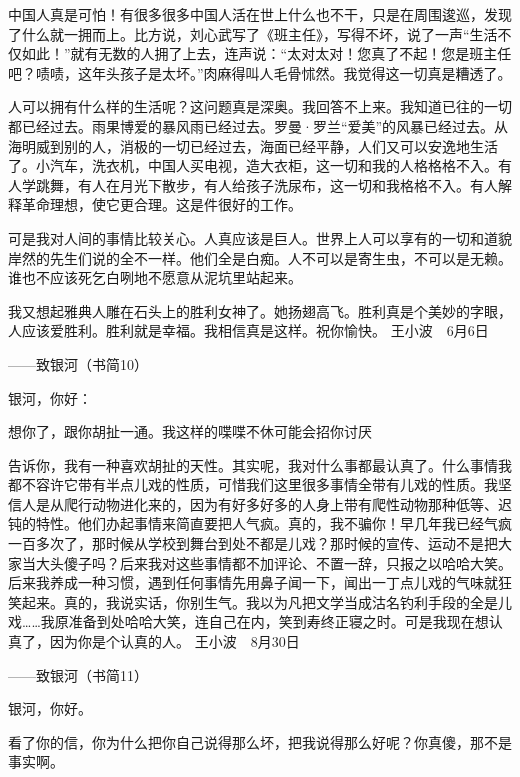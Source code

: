 中国人真是可怕！有很多很多中国人活在世上什么也不干，只是在周围逡巡，发现了什么就一拥而上。比方说，刘心武写了《班主任》，写得不坏，说了一声“生活不仅如此！”就有无数的人拥了上去，连声说：“太对太对！您真了不起！您是班主任吧？啧啧，这年头孩子是太坏。”肉麻得叫人毛骨怵然。我觉得这一切真是糟透了。 

人可以拥有什么样的生活呢？这问题真是深奥。我回答不上来。我知道已往的一切都已经过去。雨果博爱的暴风雨已经过去。罗曼·罗兰“爱美”的风暴已经过去。从海明威到别的人，消极的一切已经过去，海面已经平静，人们又可以安逸地生活了。小汽车，洗衣机，中国人买电视，造大衣柜，这一切和我的人格格格不入。有人学跳舞，有人在月光下散步，有人给孩子洗尿布，这一切和我格格不入。有人解释革命理想，使它更合理。这是件很好的工作。 

可是我对人间的事情比较关心。人真应该是巨人。世界上人可以享有的一切和道貌岸然的先生们说的全不一样。他们全是白痴。人不可以是寄生虫，不可以是无赖。谁也不应该死乞白咧地不愿意从泥坑里站起来。 

我又想起雅典人雕在石头上的胜利女神了。她扬翅高飞。胜利真是个美妙的字眼，人应该爱胜利。胜利就是幸福。我相信真是这样。祝你愉快。 王小波　6月6日 







——致银河（书简10） 

银河，你好：　 

想你了，跟你胡扯一通。我这样的喋喋不休可能会招你讨厌 

告诉你，我有一种喜欢胡扯的天性。其实呢，我对什么事都最认真了。什么事情我都不容许它带有半点儿戏的性质，可惜我们这里很多事情全带有儿戏的性质。我坚信人是从爬行动物进化来的，因为有好多好多的人身上带有爬性动物那种低等、迟钝的特性。他们办起事情来简直要把人气疯。真的，我不骗你！早几年我已经气疯一百多次了，那时候从学校到舞台到处不都是儿戏？那时候的宣传、运动不是把大家当大头傻子吗？后来我对这些事情都不加评论、不置一辞，只报之以哈哈大笑。后来我养成一种习惯，遇到任何事情先用鼻子闻一下，闻出一丁点儿戏的气味就狂笑起来。真的，我说实话，你别生气。我以为凡把文学当成沽名钓利手段的全是儿戏……我原准备到处哈哈大笑，连自己在内，笑到寿终正寝之时。可是我现在想认真了，因为你是个认真的人。 王小波　8月30日 







——致银河（书简11） 

银河，你好。 

看了你的信，你为什么把你自己说得那么坏，把我说得那么好呢？你真傻，那不是事实啊。 

